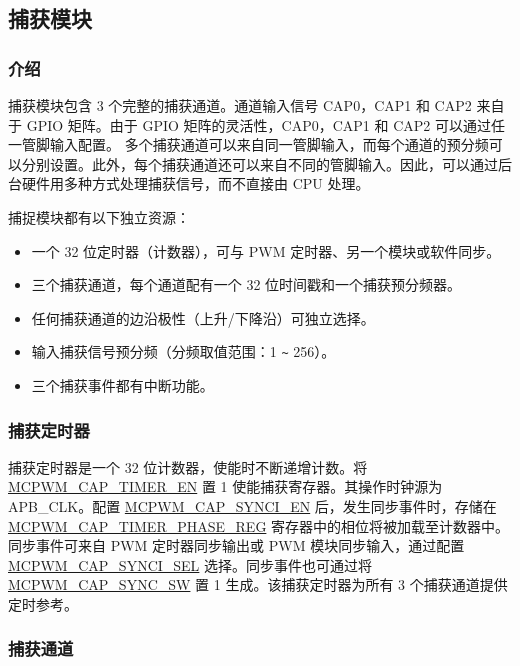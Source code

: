 \documentclass[main\_\_CN.tex]{subfiles}
\begin{document}
\subsection{捕获模块}
\subsubsection{介绍}

捕获模块包含 3 个完整的捕获通道。通道输入信号 CAP0，CAP1 和 CAP2 来自于 GPIO 矩阵。由于 GPIO 矩阵的灵活性，CAP0，CAP1 和 CAP2 可以通过任一管脚输入配置。 多个捕获通道可以来自同一管脚输入，而每个通道的预分频可以分别设置。此外，每个捕获通道还可以来自不同的管脚输入。因此，可以通过后台硬件用多种方式处理捕获信号，而不直接由 CPU 处理。

捕捉模块都有以下独立资源：
\begin{itemize}
    \item  一个 32 位定时器（计数器），可与 PWM 定时器、另一个模块或软件同步。
    \item 三个捕获通道，每个通道配有一个 32 位时间戳和一个捕获预分频器。
    \item 任何捕获通道的边沿极性（上升/下降沿）可独立选择。
    \item 输入捕获信号预分频（分频取值范围：1 \verb+~+ 256）。
    \item 三个捕获事件都有中断功能。
\end{itemize}

\subsubsection{捕获定时器}
 捕获定时器是一个 32 位计数器，使能时不断递增计数。将 \hyperref[fielddesc:MCPWMCAPTIMEREN]{MCPWM\_CAP\_TIMER\_EN} 置 1 使能捕获寄存器。其操作时钟源为 APB\_CLK。配置 \hyperref[fielddesc:MCPWMCAPSYNCIEN]{MCPWM\_CAP\_SYNCI\_EN} 后，发生同步事件时，存储在\\ \hyperref[regdesc:MCPWMCAPTIMERPHASEREG]{MCPWM\_CAP\_TIMER\_PHASE\_REG} 寄存器中的相位将被加载至计数器中。同步事件可来自 PWM 定时器同步输出或 PWM 模块同步输入，通过配置 \hyperref[fielddesc:MCPWMCAPSYNCISEL]{MCPWM\_CAP\_SYNCI\_SEL} 选择。同步事件也可通过将 \hyperref[fielddesc:MCPWMCAPSYNCSW]{MCPWM\_CAP\_SYNC\_SW} 置 1 生成。该捕获定时器为所有 3 个捕获通道提供定时参考。

\subsubsection{捕获通道}
\end{document}
